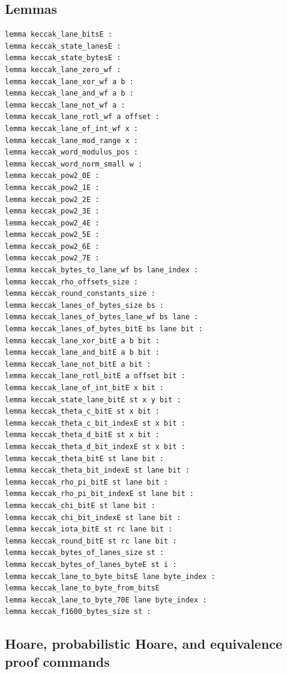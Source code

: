 \subsection*{Lemmas}
\begin{lstlisting}[language=EasyCrypt,basicstyle=\ttfamily\tiny]
lemma keccak_lane_bitsE :
lemma keccak_state_lanesE :
lemma keccak_state_bytesE :
lemma keccak_lane_zero_wf :
lemma keccak_lane_xor_wf a b :
lemma keccak_lane_and_wf a b :
lemma keccak_lane_not_wf a :
lemma keccak_lane_rotl_wf a offset :
lemma keccak_lane_of_int_wf x :
lemma keccak_lane_mod_range x :
lemma keccak_word_modulus_pos :
lemma keccak_word_norm_small w :
lemma keccak_pow2_0E :
lemma keccak_pow2_1E :
lemma keccak_pow2_2E :
lemma keccak_pow2_3E :
lemma keccak_pow2_4E :
lemma keccak_pow2_5E :
lemma keccak_pow2_6E :
lemma keccak_pow2_7E :
lemma keccak_bytes_to_lane_wf bs lane_index :
lemma keccak_rho_offsets_size :
lemma keccak_round_constants_size :
lemma keccak_lanes_of_bytes_size bs :
lemma keccak_lanes_of_bytes_lane_wf bs lane :
lemma keccak_lanes_of_bytes_bitE bs lane bit :
lemma keccak_lane_xor_bitE a b bit :
lemma keccak_lane_and_bitE a b bit :
lemma keccak_lane_not_bitE a bit :
lemma keccak_lane_rotl_bitE a offset bit :
lemma keccak_lane_of_int_bitE x bit :
lemma keccak_state_lane_bitE st x y bit :
lemma keccak_theta_c_bitE st x bit :
lemma keccak_theta_c_bit_indexE st x bit :
lemma keccak_theta_d_bitE st x bit :
lemma keccak_theta_d_bit_indexE st x bit :
lemma keccak_theta_bitE st lane bit :
lemma keccak_theta_bit_indexE st lane bit :
lemma keccak_rho_pi_bitE st lane bit :
lemma keccak_rho_pi_bit_indexE st lane bit :
lemma keccak_chi_bitE st lane bit :
lemma keccak_chi_bit_indexE st lane bit :
lemma keccak_iota_bitE st rc lane bit :
lemma keccak_round_bitE st rc lane bit :
lemma keccak_bytes_of_lanes_size st :
lemma keccak_bytes_of_lanes_byteE st i :
lemma keccak_lane_to_byte_bitsE lane byte_index :
lemma keccak_lane_to_byte_from_bitsE
lemma keccak_lane_to_byte_70E lane byte_index :
lemma keccak_f1600_bytes_size st :
\end{lstlisting}

\subsection*{Hoare, probabilistic Hoare, and equivalence proof commands}
\begin{lstlisting}[language=EasyCrypt,basicstyle=\ttfamily\tiny]
\end{lstlisting}
